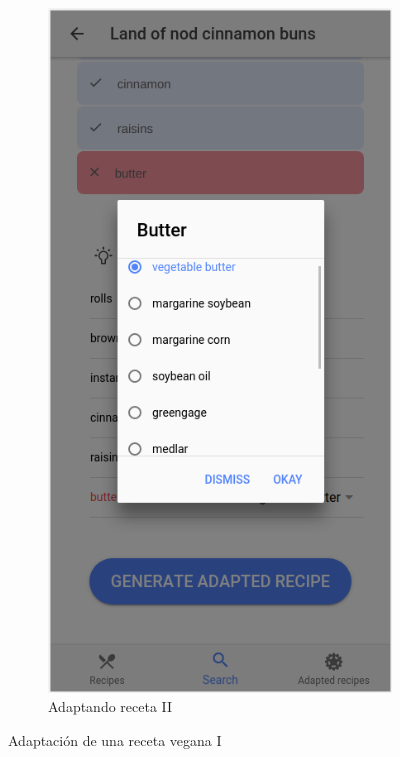 \begin{figure}[H]
\begin{subfigure}[b]{0.303\linewidth}
        \label{fig:ejemplo2}
    \end{subfigure}
    \begin{subfigure}[b]{0.30\linewidth}
        \includegraphics[width=\linewidth]{imagenes/app/pantallas/ejemplo3.png}
        \caption{Adaptando receta II}
        \label{fig:ejemplo3}
    \end{subfigure}
    \caption{Adaptación de una receta vegana I}
    \label{fig:seleccion1}
\end{figure} 

